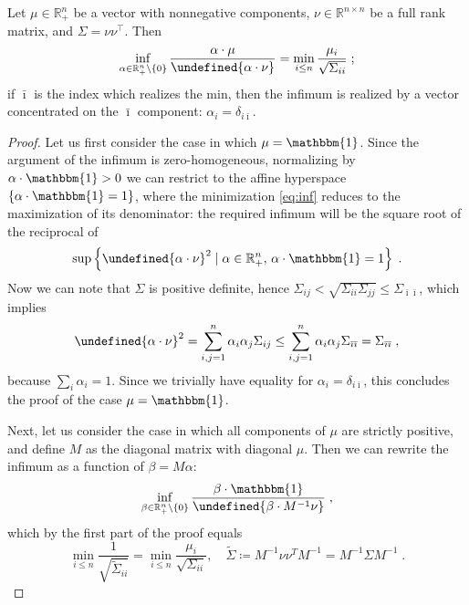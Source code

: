 \documentclass[runningheads]{m2ef}
\newcommand{\tr}[1]{{#1}^{\intercal}} %
\let\norm\undefined %
\DeclarePairedDelimiter\norm{\lVert}{\rVert}
\begin{document}
	\begin{lemma}
		Let $\mu \in \mathbb{R}^n_+$ be a vector with nonnegative components, $\nu \in \mathbb{R}^{n\times n}$ be a full rank matrix, and $\Sigma = \nu \tr{\nu}$. Then
		\begin{equation}\label{eq:inf}
			\inf_{\alpha \in \mathbb{R}_{+}^n \setminus \{0\}} \frac{\alpha \cdot \mu}{\norm{\alpha \cdot \nu}} = \min_{i\leq n} \frac{\mu_i}{\sqrt{\Sigma_{ii}}} \; ;
		\end{equation}
		if $\bar{\imath}$ is the index which realizes the min, then the infimum is realized by a vector concentrated on the $\bar{\imath}$ component: $\alpha_i = \delta_{i\bar{\imath}}$. 
	\end{lemma}
	\begin{proof}
		Let us first consider the case in which $\mu = \mathbbm{1}$. Since the argument of the infimum is zero-homogeneous, normalizing by $\alpha \cdot \mathbbm{1} > 0$ we can restrict to the affine hyperspace $\{\alpha \cdot \mathbbm{1} = 1\}$, where the minimization \eqref{eq:inf} reduces to the maximization of its denominator: the required infimum will be the square root of the reciprocal of
		\begin{equation}
		\sup\left\{\norm{\alpha \cdot \nu}^2 \mid \alpha \in \mathbb{R}_{+}^n,\, \alpha \cdot \mathbbm{1} = 1\right\} \; .
		\end{equation}
		Now we can note that $\Sigma$ is positive definite, hence $\Sigma_{ij} < \sqrt{\Sigma_{ii}\Sigma_{jj}} \leq \Sigma_{\bar{\imath}\bar{\imath}}$, which implies
		\begin{equation}
		\norm{\alpha \cdot \nu}^2 = \sum_{i,j=1}^{n} \alpha_i \alpha_j \Sigma_{ij} \leq \sum_{i,j=1}^{n} \alpha_i \alpha_j \Sigma_{\bar{\imath}\bar{\imath}} = \Sigma_{\bar{\imath}\bar{\imath}} \; ,
		\end{equation}
		because $\sum_i \alpha_i = 1$. Since we trivially have equality for $\alpha_i = \delta_{i\bar{\imath}}$, this concludes the proof of the case $\mu = \mathbbm{1}$.
		
		Next, let us consider the case in which all components of $\mu$ are strictly positive, and define $M$ as the diagonal matrix with diagonal $\mu$. Then we can rewrite the infimum as a function of $\beta = M\alpha$:
		\begin{equation}
		\inf_{\beta \in \mathbb{R}_{+}^n \setminus \{0\}} \frac{\beta \cdot \mathbbm{1}}{\norm{\beta \cdot M^{-1}\nu}} \; ,
		\end{equation}
		which by the first part of the proof equals 
		\begin{equation}
		\min_{i \leq n} \frac{1}{\sqrt{\tilde{\Sigma}_{ii}}} = \min_{i \leq n} \frac{\mu_i}{\sqrt{\Sigma_{ii}}}, \quad \tilde{\Sigma} \coloneqq M^{-1}\nu\nu^{T} M^{-1} = M^{-1}\Sigma M^{-1} \; .
		\end{equation}
		

\end{proof}
\end{document}
